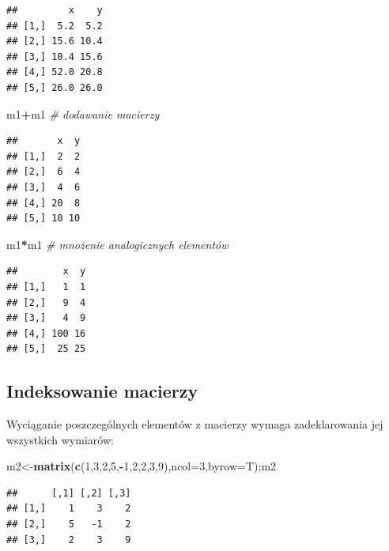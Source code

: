 \documentclass[]{book}
\newenvironment{Shaded}{\begin{snugshade}}{\end{snugshade}}
\newcommand{\KeywordTok}[1]{\textcolor[rgb]{0.13,0.29,0.53}{\textbf{#1}}}
\newcommand{\DataTypeTok}[1]{\textcolor[rgb]{0.13,0.29,0.53}{#1}}
\newcommand{\DecValTok}[1]{\textcolor[rgb]{0.00,0.00,0.81}{#1}}
\newcommand{\CommentTok}[1]{\textcolor[rgb]{0.56,0.35,0.01}{\textit{#1}}}
\newcommand{\OperatorTok}[1]{\textcolor[rgb]{0.81,0.36,0.00}{\textbf{#1}}}
\newcommand{\NormalTok}[1]{#1}
\theoremstyle{definition}
\theoremstyle{definition}
\theoremstyle{definition}
\theoremstyle{remark}
\begin{document}
\begin{verbatim}
##         x    y
## [1,]  5.2  5.2
## [2,] 15.6 10.4
## [3,] 10.4 15.6
## [4,] 52.0 20.8
## [5,] 26.0 26.0
\end{verbatim}

\begin{Shaded}
\begin{Highlighting}[]
\NormalTok{m1}\OperatorTok{+}\NormalTok{m1 }\CommentTok{# dodawanie macierzy}
\end{Highlighting}
\end{Shaded}

\begin{verbatim}
##       x  y
## [1,]  2  2
## [2,]  6  4
## [3,]  4  6
## [4,] 20  8
## [5,] 10 10
\end{verbatim}

\begin{Shaded}
\begin{Highlighting}[]
\NormalTok{m1}\OperatorTok{*}\NormalTok{m1 }\CommentTok{# mnożenie analogicznych elementów}
\end{Highlighting}
\end{Shaded}

\begin{verbatim}
##        x  y
## [1,]   1  1
## [2,]   9  4
## [3,]   4  9
## [4,] 100 16
## [5,]  25 25
\end{verbatim}

\subsection{Indeksowanie macierzy}\label{indeksowanie-macierzy}

Wyciąganie poszczególnych elementów z macierzy wymaga zadeklarowania jej
wszystkich wymiarów:

\begin{Shaded}
\begin{Highlighting}[]
\NormalTok{m2<-}\KeywordTok{matrix}\NormalTok{(}\KeywordTok{c}\NormalTok{(}\DecValTok{1}\NormalTok{,}\DecValTok{3}\NormalTok{,}\DecValTok{2}\NormalTok{,}\DecValTok{5}\NormalTok{,}\OperatorTok{-}\DecValTok{1}\NormalTok{,}\DecValTok{2}\NormalTok{,}\DecValTok{2}\NormalTok{,}\DecValTok{3}\NormalTok{,}\DecValTok{9}\NormalTok{),}\DataTypeTok{ncol=}\DecValTok{3}\NormalTok{,}\DataTypeTok{byrow=}\NormalTok{T);m2}
\end{Highlighting}
\end{Shaded}

\begin{verbatim}
##      [,1] [,2] [,3]
## [1,]    1    3    2
## [2,]    5   -1    2
## [3,]    2    3    9
\end{verbatim}
\end{document}
